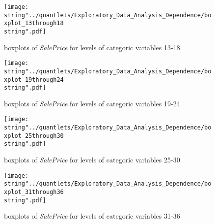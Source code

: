 \begin{figure}[H]
\centering
\begin{minipage}{.5\textwidth}
	\centering
	\texttt{[image: \\string"../quantlets/Exploratory\_Data\_Analysis\_Dependence/boxplot\_13through18\\string".pdf]}
  	\caption{boxplots of \textit{SalePrice} for levels of categoric variables 13-18}
  	\label{fig:box13to18}
\end{minipage}%
\begin{minipage}{.5\textwidth}
\centering
	\texttt{[image: \\string"../quantlets/Exploratory\_Data\_Analysis\_Dependence/boxplot\_19through24\\string".pdf]}
  	\caption{boxplots of \textit{SalePrice} for levels of categoric variables 19-24}
  	\label{fig:box19to24}
\end{minipage}
\end{figure}

\begin{figure}[H]
\centering
\begin{minipage}{.5\textwidth}
	\centering
	\texttt{[image: \\string"../quantlets/Exploratory\_Data\_Analysis\_Dependence/boxplot\_25through30\\string".pdf]}
  	\caption{boxplots of \textit{SalePrice} for levels of categoric variables 25-30}
  	\label{fig:box25to30}
\end{minipage}%
\begin{minipage}{.5\textwidth}
\centering
	\texttt{[image: \\string"../quantlets/Exploratory\_Data\_Analysis\_Dependence/boxplot\_31through36\\string".pdf]}
  	\caption{boxplots of \textit{SalePrice} for levels of categoric variables 31-36}
  	\label{fig:box31to36}
\end{minipage}
\end{figure}



